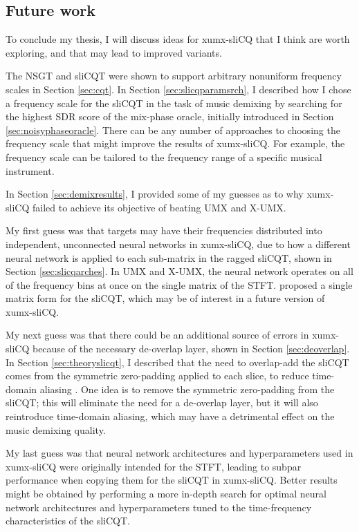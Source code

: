 \documentclass[report.tex]{subfiles}
\begin{document}
\subsection{Future work}

To conclude my thesis, I will discuss ideas for xumx-sliCQ that I think are worth exploring, and that may lead to improved variants.

The NSGT and sliCQT were shown to support arbitrary nonuniform frequency scales in Section \ref{sec:cqt}. In Section \ref{sec:slicqparamsrch}, I described how I chose a frequency scale for the sliCQT in the task of music demixing by searching for the highest SDR score of the mix-phase oracle, initially introduced in Section \ref{sec:noisyphaseoracle}. There can be any number of approaches to choosing the frequency scale that might improve the results of xumx-sliCQ. For example, the frequency scale can be tailored to the frequency range of a specific musical instrument.

In Section \ref{sec:demixresults}, I provided some of my guesses as to why xumx-sliCQ failed to achieve its objective of beating UMX and X-UMX.

My first guess was that targets may have their frequencies distributed into independent, unconnected neural networks in xumx-sliCQ, due to how a different neural network is applied to each sub-matrix in the ragged sliCQT, shown in Section \ref{sec:slicqarches}. In UMX and X-UMX, the neural network operates on all of the frequency bins at once on the single matrix of the STFT. \textcite{variableq1} proposed a single matrix form for the sliCQT, which may be of interest in a future version of xumx-sliCQ.

My next guess was that there could be an additional source of errors in xumx-sliCQ because of the necessary de-overlap layer, shown in Section \ref{sec:deoverlap}. In Section \ref{sec:theoryslicqt}, I described that the need to overlap-add the sliCQT comes from the symmetric zero-padding applied to each slice, to reduce time-domain aliasing \parencite{slicq}. One idea is to remove the symmetric zero-padding from the sliCQT; this will eliminate the need for a de-overlap layer, but it will also reintroduce time-domain aliasing, which may have a detrimental effect on the music demixing quality.

My last guess was that neural network architectures and hyperparameters used in xumx-sliCQ were originally intended for the STFT, leading to subpar performance when copying them for the sliCQT in xumx-sliCQ. Better results might be obtained by performing a more in-depth search for optimal neural network architectures and hyperparameters tuned to the time-frequency characteristics of the sliCQT.
\end{document}
